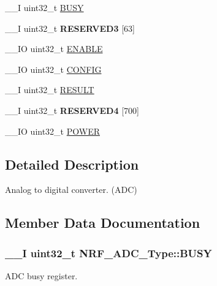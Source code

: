 \begin{DoxyCompactItemize}
\item 
\+\_\+\+\_\+\+I uint32\+\_\+t \hyperlink{struct_n_r_f___a_d_c___type_abcfd5a967815919855224329cbace02e}{B\+U\+S\+Y}
\item 
\hypertarget{struct_n_r_f___a_d_c___type_aaf919ffd935835840f4daa6d7fb754dc}{}\+\_\+\+\_\+\+I uint32\+\_\+t {\bfseries R\+E\+S\+E\+R\+V\+E\+D3} \mbox{[}63\mbox{]}\label{struct_n_r_f___a_d_c___type_aaf919ffd935835840f4daa6d7fb754dc}

\item 
\+\_\+\+\_\+\+I\+O uint32\+\_\+t \hyperlink{struct_n_r_f___a_d_c___type_ae7384497c60bd3633313aa1897f61610}{E\+N\+A\+B\+L\+E}
\item 
\+\_\+\+\_\+\+I\+O uint32\+\_\+t \hyperlink{struct_n_r_f___a_d_c___type_a6d28e6f0953ce6ca635bf0bd83f12595}{C\+O\+N\+F\+I\+G}
\item 
\+\_\+\+\_\+\+I uint32\+\_\+t \hyperlink{struct_n_r_f___a_d_c___type_a2e04db1e733d38653f374e7a0acc24aa}{R\+E\+S\+U\+L\+T}
\item 
\hypertarget{struct_n_r_f___a_d_c___type_a37e89c46cd7663a1fc49c1b0ce24e52f}{}\+\_\+\+\_\+\+I uint32\+\_\+t {\bfseries R\+E\+S\+E\+R\+V\+E\+D4} \mbox{[}700\mbox{]}\label{struct_n_r_f___a_d_c___type_a37e89c46cd7663a1fc49c1b0ce24e52f}

\item 
\+\_\+\+\_\+\+I\+O uint32\+\_\+t \hyperlink{struct_n_r_f___a_d_c___type_ab51f5bde9f3ddf1de220882664fb53ed}{P\+O\+W\+E\+R}
\end{DoxyCompactItemize}


\subsection{Detailed Description}
Analog to digital converter. (A\+D\+C) 

\subsection{Member Data Documentation}
\hypertarget{struct_n_r_f___a_d_c___type_abcfd5a967815919855224329cbace02e}{}
\subsubsection[{B\+U\+S\+Y}]{\setlength{\rightskip}{0pt plus 5cm}\+\_\+\+\_\+\+I uint32\+\_\+t N\+R\+F\+\_\+\+A\+D\+C\+\_\+\+Type\+::\+B\+U\+S\+Y}\label{struct_n_r_f___a_d_c___type_abcfd5a967815919855224329cbace02e}
A\+D\+C busy register. \hypertarget{struct_n_r_f___a_d_c___type_a6d28e6f0953ce6ca635bf0bd83f12595}{}
